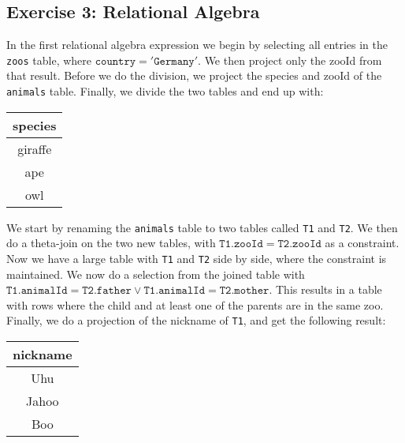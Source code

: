 \subsection{Exercise 3: Relational Algebra}

In the first relational algebra expression we begin by selecting all entries in the \texttt{zoos} table, where $\mathtt{country} = \mathtt{'Germany'}$.
We then project only the zooId from that result.
Before we do the division, we project the species and zooId of the \texttt{animals} table.
Finally, we divide the two tables and end up with:

\begin{center}
  \begin{tabular}{ c }
    \hline
    species \\  
    \hline
    giraffe \\
    ape \\
    owl \\
    \hline
  \end{tabular}
\end{center}

We start by renaming the \texttt{animals} table to two tables called \texttt{T1} and \texttt{T2}.
We then do a theta-join on the two new tables, with $\mathtt{T1.zooId} = \mathtt{T2.zooId}$ as a constraint.
Now we have a large table with \texttt{T1} and \texttt{T2} side by side, where the constraint is maintained.
We now do a selection from the joined table with $\mathtt{T1.animalId} = \mathtt{T2.father} \vee \mathtt{T1.animalId} = \mathtt{T2.mother}$.
This results in a table with rows where the child and at least one of the parents are in the same zoo.
Finally, we do a projection of the nickname of \texttt{T1}, and get the following result:

\begin{center}
  \begin{tabular}{ c }
    \hline
    nickname \\  
    \hline
    Uhu \\
    Jahoo \\
    Boo \\
    \hline
  \end{tabular}
\end{center}

